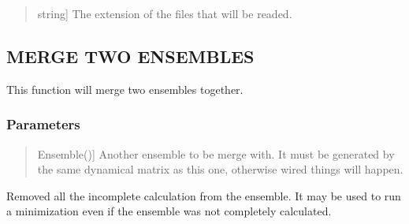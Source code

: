 \documentclass[a4paper,11pt,english]{sphinxmanual}
\begin{document}
\begin{fulllineitems}
\begin{fulllineitems}
\begin{quote}
\begin{description}
\sphinxlineitem{out\_ext}{[}string{]}
\sphinxAtStartPar
The extension of the files that will be readed.

\end{description}
\end{quote}

\end{fulllineitems}


\begin{fulllineitems}
\label{\detokenize{apireference:sscha.Ensemble.Ensemble.merge}}
\pysigstartsignatures
{}
\pysigstopsignatures

\subsection{MERGE TWO ENSEMBLES}
\label{\detokenize{apireference:merge-two-ensembles}}
\sphinxAtStartPar
This function will merge two ensembles together.


\subsubsection{Parameters}
\label{\detokenize{apireference:id20}}\begin{quote}
\begin{description}
\sphinxlineitem{other}{[}Ensemble(){]}
\sphinxAtStartPar
Another ensemble to be merge with. It must be generated by the same dynamical matrix
as this one, otherwise wired things will happen.

\end{description}
\end{quote}

\end{fulllineitems}


\begin{fulllineitems}
\label{\detokenize{apireference:sscha.Ensemble.Ensemble.remove_noncomputed}}
\pysigstartsignatures
{}
\pysigstopsignatures
\sphinxAtStartPar
Removed all the incomplete calculation from the ensemble.
It may be used to run a minimization even if the ensemble was not completely calculated.


\end{fulllineitems}
\end{fulllineitems}
\end{document}
